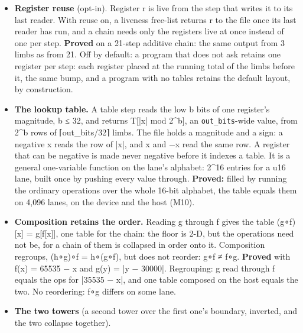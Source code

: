 \begin{itemize}
\begin{itemize}
\begin{itemize}
\item Every output bit is rebuilt from the raw fields one bit at a time, and each sign still holds 64 bits past its written width. This holds on 4,096 lanes in the 64-limb file and 512 in the 256-limb file.
\item Hand-worked answers match.
\item The narrowed widths are exactly the rule's: 32, 20, 20, 32, 41, 41, 32 and 32 over unsigned 32- and 20-bit fields and a signed 40-bit field. All 4,096 lanes equal the oracle past every narrowed width.
\item A wrap below 4 bits is refused at imprint (\texttt{test/\allowbreak{}engine/\allowbreak{}compiler/\allowbreak{}cycle/\allowbreak{}record\_\allowbreak{}bitwise\_\allowbreak{}test}, 24 checks, 0 failed).
\end{itemize}
\end{itemize}
\item \textbf{Register reuse} (opt-in). Register r is live from the step that writes it to its last reader. With reuse on, a liveness free-list returns r to the file once its last reader has run, and a chain needs only the registers live at once instead of one per step. \textbf{Proved} on a 21-step additive chain: the same output from 3 limbs as from 21. Off by default: a program that does not ask retains one register per step: each register placed at the running total of the limbs before it, the same bump, and a program with no tables retains the default layout, by construction.
\item \textbf{The lookup table.} A table step reads the low b bits of one register's magnitude, b ≤ 32, and returns T[|x| mod 2\textasciicircum{}b], an \texttt{out\_\allowbreak{}bits}-wide value, from 2\textasciicircum{}b rows of ⌈out\_\allowbreak{}bits/32⌉ limbs. The file holds a magnitude and a sign: a negative x reads the row of |x|, and x and −x read the same row. A register that can be negative is made never negative before it indexes a table. It is a general one-variable function on the lane's alphabet: 2\textasciicircum{}16 entries for a u16 lane, built once by pushing every value through. \textbf{Proved:} filled by running the ordinary operations over the whole 16-bit alphabet, the table equals them on 4,096 lanes, on the device and the host (M10).
\item \textbf{Composition retains the order.} Reading g through f gives the table (g∘f)[x] = g[f[x]], one table for the chain: the floor is 2-D, but the operations need not be, for a chain of them is collapsed in order onto it. Composition regroups, (h∘g)∘f = h∘(g∘f), but does not reorder: g∘f ≠ f∘g. \textbf{Proved} with f(x) = 65535 − x and g(y) = |y − 30000|. Regrouping: g read through f equals the ops for |35535 − x|, and one table composed on the host equals the two. No reordering: f∘g differs on some lane.
\item \textbf{The two towers} (a second tower over the first one's boundary, inverted, and the two collapse together).


\end{itemize}
